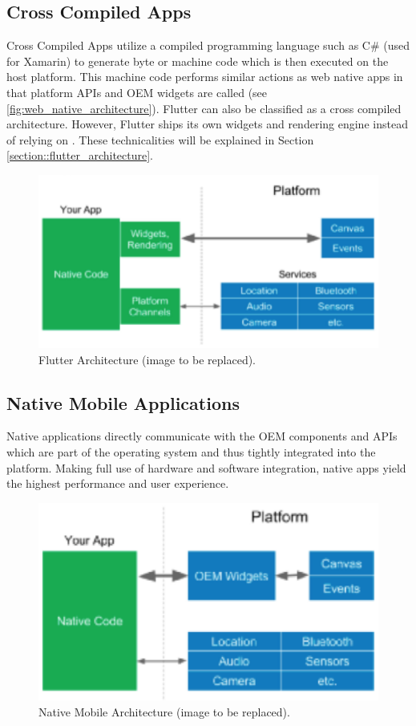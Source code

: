 \subsection{Cross Compiled Apps}
Cross Compiled Apps utilize a compiled programming language such as C\# (used for Xamarin) to generate byte or machine code which is then executed 
on the host platform. This machine code performs similar actions as web native apps in that platform APIs and OEM widgets are called (see \ref{fig:web_native_architecture}).
Flutter can also be classified as a cross compiled architecture. However, Flutter ships its own widgets and rendering engine instead of relying on
. These technicalities will be explained in Section \ref{section::flutter_architecture}.

\begin{figure}
    \includegraphics[width=\linewidth]{images/architectures/flutter_architecture.eps}
    \caption{Flutter Architecture (image to be replaced).}
    \label{fig:flutter_architecture}
\end{figure}

\subsection{Native Mobile Applications}
Native applications directly communicate with the OEM components and APIs which are part of the operating system and thus tightly integrated into the platform.
Making full use of hardware and software integration, native apps yield the highest performance and user experience.

\begin{figure}
    \includegraphics[width=\linewidth]{images/architectures/native_architecture.eps}
    \caption{Native Mobile Architecture (image to be replaced).}
    \label{fig:native_architecture}
\end{figure}

